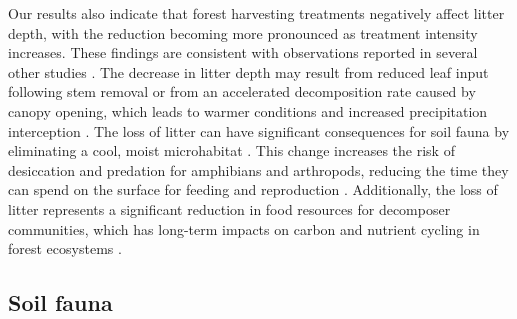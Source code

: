


Our results also indicate that forest harvesting treatments negatively affect litter depth, with the reduction becoming more pronounced as treatment intensity increases.  
These findings are consistent with observations reported in several other studies \citep{Marshall2000Impactsforest,Mazerolle2021Woodlandsalamander}.  
The decrease in litter depth may result from reduced leaf input following stem removal or from an accelerated decomposition rate caused by canopy opening, 
which leads to warmer conditions and increased precipitation interception \citep{Fierer2005LitterQuality,Butenschoen2011Interactiveeffects,Ameray2021Forestcarbon}.  
The loss of litter can have significant consequences for soil fauna by eliminating a cool, moist microhabitat \citep{spotilaRoleTemperatureWater1972,groverInfluenceCoverMoisture1998a,Niemela2007effectsforestry}.  
This change increases the risk of desiccation and predation for amphibians and arthropods, reducing the time they can spend on the surface for feeding and reproduction \citep{deMaynadier1995relationshipforest,koivula.LeafLitterSmallscale1999,Walton2013Topdownregulation}.  
Additionally, the loss of litter represents a significant reduction in food resources for decomposer communities, which has long-term impacts on carbon and nutrient cycling in forest ecosystems \citep{Handa2014Consequencesbiodiversity}.  





\subsection*{Soil fauna}
\label{disc:soil_fauna}


